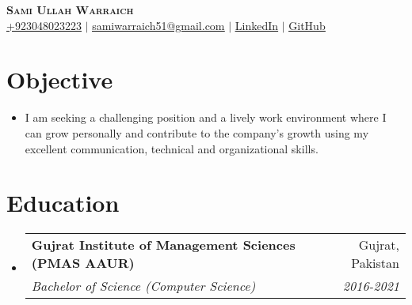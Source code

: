 \documentclass[letterpaper,11pt]{article}
\makeatletter
\newcommand{\resumeItem}[1]{
  \item\small{
    {#1 \vspace{-2pt}}
  }
}
\newcommand{\resumeSubheading}[4]{
  \vspace{-1pt}\item
    \begin{tabular*}{0.97\textwidth}[t]{l@{\extracolsep{\fill}}r}
      \textbf{#1} & #2 \\
      \textit{\small#3} & \textit{\small #4} \\
    \end{tabular*}\vspace{-6pt}
}
\newcommand{\resumeSubHeadingListStart}{\begin{itemize}[leftmargin=0.15in, label={}]}
\newcommand{\resumeSubHeadingListEnd}{\end{itemize}}
\newcommand{\resumeItemListStart}{\begin{itemize}}
\newcommand{\resumeItemListEnd}{\end{itemize}\vspace{-4pt}}
\makeatother
\begin{document}

\begin{center}
    \textbf{\Huge \scshape Sami Ullah Warraich} \\ \vspace{1pt}
    \small 
    \href{https://wa.me/+923048023223}{\underline{+923048023223}} $|$ 
    \href{mailto:samiwarraich51@gmail.com}{\underline{samiwarraich51@gmail.com}} $|$ 
    \href{https://linkedin.com/in/sami-warraich}{\underline{LinkedIn}} $|$
    \href{https://github.com/samiwarraich}{\underline{GitHub}} 
\end{center}



\section{Objective}
     \resumeItemListStart
        \resumeItem{I am seeking a challenging position and a lively work environment where I can grow personally and contribute to the company’s growth using my excellent communication, technical and organizational skills.}\vspace{-10pt}
    \resumeItemListEnd

\section{Education}
  \resumeSubHeadingListStart
    \resumeSubheading
      {Gujrat Institute of Management Sciences (PMAS AAUR)}{Gujrat, Pakistan}
      {Bachelor of Science (Computer Science)}{2016-2021}
  \resumeSubHeadingListEnd


\end{document}
